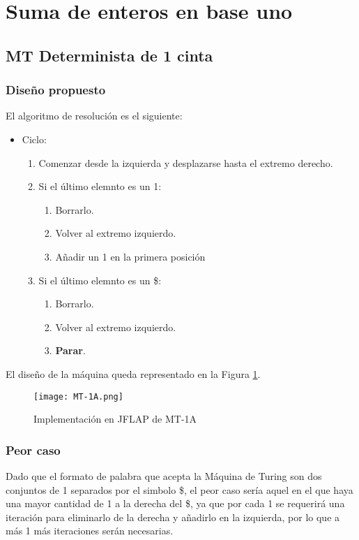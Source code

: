 \section{Suma de enteros en base uno}

\subsection{MT Determinista de 1 cinta}

\subsubsection*{Diseño propuesto}
El algoritmo de resolución es el siguiente:

\begin{itemize}
    \item Ciclo:
    \begin{enumerate}[1.]
        \item Comenzar desde la izquierda y desplazarse hasta el extremo derecho.
        \item Si el último elemnto es un 1:
        \begin{enumerate}[1.]
            \item Borrarlo.
            \item Volver al extremo izquierdo.
            \item Añadir un 1 en la primera posición
        \end{enumerate}
        \item Si el último elemnto es un \$:
        \begin{enumerate}[1.]
            \item Borrarlo.
            \item Volver al extremo izquierdo.
            \item \textbf{Parar}.
        \end{enumerate}
    \end{enumerate}
\end{itemize}

El diseño de la máquina queda representado en la Figura \ref{fig:MT-1A}.

\begin{figure}[h]
    \texttt{[image: MT-1A.png]}
    \caption{Implementación en JFLAP de MT-1A}
    \label{fig:MT-1A}
\end{figure}


\subsubsection*{Peor caso}
Dado que el formato de palabra que acepta la Máquina de Turing son dos conjuntos de 1 separados por el simbolo \$, el peor caso sería aquel en el que haya una mayor cantidad de 1 a la derecha del \$, ya que por cada 1 se requerirá una iteración para eliminarlo de la derecha y añadirlo en la izquierda, por lo que a más 1 más iteraciones serán necesarias.


